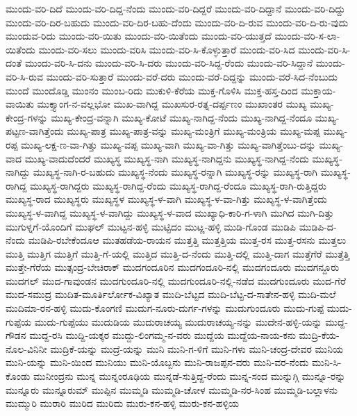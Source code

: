 {ಮುಂದು-ವರಿ-ದಿದೆ
ಮುಂದು-ವರಿ-ದಿದ್ದ-ನೆಂದು
ಮುಂದು-ವರಿ-ದಿದ್ದರೆ
ಮುಂದು-ವರಿ-ದಿದ್ದಾನೆ
ಮುಂದು-ವರಿ-ದಿದ್ದು
ಮುಂದು-ವರಿ-ದಿರ-ಬಹುದು
ಮುಂದು-ವರಿ-ದಿರ-ಬಹು-ದೆಂದು
ಮುಂದು-ವರಿ-ದಿ-ರುವ
ಮುಂದು-ವರಿ-ದಿ-ರು-ವುದು
ಮುಂದುವ-ರಿದು
ಮುಂದು-ವರಿ-ಯಿತು
ಮುಂದು-ವರಿ-ಯಿತೆಂದು
ಮುಂದು-ವರಿ-ಯುತ್ತದೆ
ಮುಂದು-ವರಿ-ಸ-ಲಾ-ಯಿತೆಂದು
ಮುಂದು-ವರಿ-ಸಲು
ಮುಂದು-ವರಿಸಿ
ಮುಂದು-ವರಿ-ಸಿ-ಕೊಳ್ಳುತ್ತಾರೆ
ಮುಂದು-ವರಿ-ಸಿದ
ಮುಂದು-ವರಿ-ಸಿ-ದಂತೆ
ಮುಂದು-ವರಿ-ಸಿ-ದನು
ಮುಂದು-ವರಿ-ಸಿ-ದರು
ಮುಂದು-ವರಿ-ಸಿದ್ದ-ರೆಂದು
ಮುಂದು-ವರಿ-ಸಿದ್ದಾನೆ
ಮುಂದು-ವರಿ-ಸಿ-ರುವ
ಮುಂದು-ವರಿ-ಸುತ್ತಾರೆ
ಮುಂದು-ವರೆ-ದರು
ಮುಂದು-ವರೆ-ದಿದ್ದನ್ನು
ಮುಂದು-ವರೆ-ಸಿದ-ನೆಂಬುದು
ಮುಂದೆ
ಮುಂದೊಡ್ಡಿ
ಮುಂನಂ
ಮುಂಬ-ರಿದು
ಮುಕುಳಿ-ಕೆರೆಯ
ಮುಕ್ತ-ಗೊಳಿಸಿ
ಮುಕ್ತ-ಹಸ್ತ-ದಿಂದ
ಮುಕ್ತಾಯ-ವಾಯಿತು
ಮುಕ್ತ್ಯಾಂಗ-ನ-ವಲ್ಲಭೋ
ಮುಖ-ವಾಗಿದ್ದ
ಮುಖಸುರ-ರತ್ನ-ದರ್ಪ್ಪಣಂ
ಮುಖಾಂತರ
ಮುಖ್ಯ
ಮುಖ್ಯ-ಕೇಂದ್ರ-ಗಳನ್ನು
ಮುಖ್ಯ-ಕೇಂದ್ರ-ವನ್ನಾಗಿ
ಮುಖ್ಯ-ಕೋಟೆ
ಮುಖ್ಯ-ನಾಗಿದ್ದ-ನೆಂದು
ಮುಖ್ಯ-ನಾಗಿದ್ದ-ನೆಂದೂ
ಮುಖ್ಯ-ಪಟ್ಟಣ-ವಾಗಿತ್ತೆಂದು
ಮುಖ್ಯ-ಪಾತ್ರ
ಮುಖ್ಯ-ಪಾತ್ರ-ವನ್ನು
ಮುಖ್ಯ-ಮಂತ್ರಿಗೆ
ಮುಖ್ಯ-ಮಂತ್ರಿಯ
ಮುಖ್ಯ-ಮಪ್ಪ
ಮುಖ್ಯ-ರಪ್ಪ
ಮುಖ್ಯ-ಲಕ್ಷ-ಣ-ವಾ-ಗಿತ್ತು
ಮುಖ್ಯ-ವಪ್ಪ
ಮುಖ್ಯ-ವಾಗಿ
ಮುಖ್ಯ-ವಾ-ಗಿತ್ತು
ಮುಖ್ಯ-ವಾಗಿತ್ತೆಂಬು-ದನ್ನು
ಮುಖ್ಯ-ವಾದ
ಮುಖ್ಯ-ವಾದುದೆಂದರೆ
ಮುಖ್ಯಸ್ಥ
ಮುಖ್ಯಸ್ಥ-ನಾಗಿ
ಮುಖ್ಯಸ್ಥ-ನಾಗಿದ್ದನು
ಮುಖ್ಯಸ್ಥ-ನಾಗಿದ್ದ-ನೆಂದು
ಮುಖ್ಯಸ್ಥ-ನಾಗಿದ್ದು
ಮುಖ್ಯಸ್ಥ-ನಾಗಿ-ರ-ಬಹುದು
ಮುಖ್ಯಸ್ಥ-ನೆಂದು
ಮುಖ್ಯಸ್ಥ-ರನ್ನಾಗಿ
ಮುಖ್ಯಸ್ಥ-ರನ್ನು
ಮುಖ್ಯಸ್ಥ-ರಾಗಿ
ಮುಖ್ಯಸ್ಥ-ರಾಗಿದ್ದ
ಮುಖ್ಯಸ್ಥ-ರಾಗಿದ್ದರು
ಮುಖ್ಯಸ್ಥ-ರಾಗಿದ್ದ-ರೆಂದು
ಮುಖ್ಯಸ್ಥ-ರಾಗಿದ್ದ-ರೆಂದೂ
ಮುಖ್ಯಸ್ಥ-ರಾಗಿ-ರುತ್ತಿದ್ದರು
ಮುಖ್ಯಸ್ಥ-ರಾದ
ಮುಖ್ಯಸ್ಥರು
ಮುಖ್ಯಸ್ಥಳ
ಮುಖ್ಯಸ್ಥ-ಳ-ವಾಗಿ
ಮುಖ್ಯಸ್ಥ-ಳ-ವಾ-ಗಿತ್ತು
ಮುಖ್ಯಸ್ಥ-ಳ-ವಾಗಿತ್ತೆಂದು
ಮುಖ್ಯಸ್ಥ-ಳ-ವಾಗಿದ್ದ
ಮುಖ್ಯಸ್ಥ-ಳ-ವಾಗಿದ್ದು
ಮುಖ್ಯಸ್ಥ-ಳ-ವಾದ
ಮುಖ್ಯಾಧಿ-ಕಾರಿ-ಗ-ಳಾಗಿ
ಮುಗಿದ
ಮುಗಿ-ದಿತ್ತು
ಮುಗುಳ್ನಗೆ-ಯೊಂದಿಗೆ
ಮುಘಲ್
ಮುಟ್ಟನ-ಹಳ್ಳಿ
ಮುಟ್ಟಿದಂ
ಮುಟ್ಣ-ಹಳ್ಳಿ
ಮುಡಿ-ಗೊಂಡ
ಮುಡಿಪಿ
ಮುಡಿಪಿ-ದ-ನೆಂದು
ಮುಡಿಪಿ-ರಬೇಕೆಂದೂಆ
ಮುತಹಡೆಯ-ರಾಯನ
ಮುತ್ತತ್ತಿ
ಮುತ್ತತ್ತಿಯ
ಮುತ್ತ-ರಸ
ಮುತ್ತ-ರಸನು
ಮುತ್ತಲು
ಮುತ್ತಿ
ಮುತ್ತಿಗ
ಮುತ್ತಿಗೆ
ಮುತ್ತಿ-ಗೆ-ಯಲ್ಲಿ
ಮುತ್ತಿದ
ಮುತ್ತಿ-ದ-ನೆಂದು
ಮುತ್ತಿ-ದಲ್ಲಿ
ಮುತ್ತಿ-ದಾಗ
ಮುತ್ತೆಗೆರೆ
ಮುತ್ತೆತ್ತಿ
ಮುತ್ತೇ-ಗೆರೆಯ
ಮುತ್ಸಂದ್ರ-ಬೇಚಿರಾಕ್
ಮುದಗಂದೂರಿನ
ಮುದಗಂದೂರಿ-ನಲ್ಲಿ
ಮುದಗಂದೂರು
ಮುದಗನ್ದೂರು
ಮುದಗಲ್
ಮುದ-ಗಾವುಂಡನ
ಮುದಗುಂದೂರಿ-ನಲ್ಲಿ
ಮುದಗುಂದೂರಿ-ನಲ್ಲಿ-ನಡೆದ
ಮುದಗುಂದೂರು
ಮುದ-ಗೆರೆ
ಮುದ-ಸಮುದ್ರ
ಮುದಿತ-ಮೂರ್ತಿರ್ಲೋಕ-ವಿಖ್ಯಾತ
ಮುದಿ-ಬೆಟ್ಟದ
ಮುದಿ-ಬೆಟ್ಟ-ದ-ಸಾತೇನ-ಹಳ್ಳಿ
ಮುದಿ-ಮಲೆ
ಮುದಿಮಾ-ರನ-ಹಳ್ಳಿ
ಮುದು-ಕೊಂಗಣಿ
ಮುದುಗ-ನೂರು-ದುರ್ಗ-ಗಳನ್ನು
ಮುದುಗುಂದೂರು
ಮುದು-ಗುಪ್ಪೆ
ಮುದು-ಗುಪ್ಪೆಯ
ಮುದು-ಗುಪ್ಪೆಯು
ಮುದುಡಿಯ
ಮುದುರಾಚಯ್ಯ
ಮುದುರಾಚಯ್ಯ-ನನ್ನು
ಮುದೇನ-ಹಳ್ಳಿ-ಯನ್ನು
ಮುದ್ದ-ಗೌಡನ
ಮುದ್ದ-ರಸಿ
ಮುದ್ದಿ-ಯಕ್ಕರ
ಮುದ್ದು-ಲಿಂಗಮ್ಮ-ನ-ವರು
ಮುದ್ದೆಯ
ಮುದ್ದೆಯ-ನಾಯ-ಕನು
ಮುದ್ರಿ-ಕೆಯ-ನೊಲ-ವಿನಿನೀ
ಮುದ್ರಿಕೆ-ಯನ್ನು
ಮುದ್ರೆ-ಯನ್ನು
ಮುನಿ
ಮುನಿ-ಗ-ಳಿಗೆ
ಮುನಿ-ಗಳು
ಮುನಿ-ಚಂದ್ರ-ದೇವರ
ಮುನಿಯ
ಮುನಿ-ಯನ್ನು
ಮುನಿ-ಯಿಂದ
ಮುನಿಯು
ಮುನಿ-ಯೊಬ್ಬನು
ಮುನಿ-ರಾಜಪ್ಪನ-ವರು
ಮುನಿ-ವರ-ನೆಂದು
ಮುನಿ-ಸಿ-ಕೊಂಡು
ಮುನೀಂದ್ರನು
ಮುನ್ನ
ಮುನ್ನಂರೂಢಿಯ
ಮುನ್ನಡೆ-ಸುತ್ತಿದ್ದ-ರೆಂದು
ಮುನ್ನ-ಸಂದ
ಮುನ್ನುಗ್ಗಿ
ಮುನ್ನೂ-ರನ್ನು
ಮುನ್ನೂರು
ಮುನ್ನೂರುಮ್
ಮುಪ್ಪಿನ
ಮುಮ್ಮಡಿ
ಮುಮ್ಮಡಿ-ಚೋಳ
ಮುಮ್ಮಡಿ-ನರ-ಸಿಂಹ
ಮುಮ್ಮಡಿ-ಬಲ್ಲಾಳನು
ಮುಮ್ಮುರಿ
ಮುರಾರಿ
ಮುರಿದ
ಮುರಿದು
ಮುರು-ಕನ-ಹಳ್ಳಿ
ಮುರು-ಕನ-ಹಳ್ಳಿಯ
}
